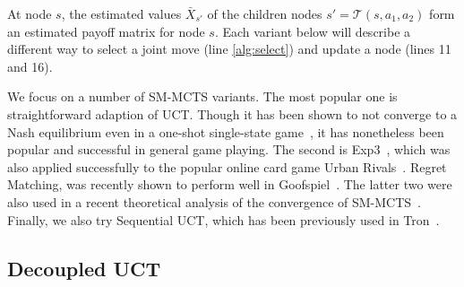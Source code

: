 \documentclass[conference]{IEEEtran}
\newcommand{\cA}{\mathcal{A}}
\newcommand{\cT}{\mathcal{T}}
\begin{document}
At node $s$, the estimated values $\bar{X}_{s'}$ of the children nodes $s' = \cT(s,a_1,a_2)$ 
form an estimated payoff matrix for node $s$. 
Each variant below will describe a different way to select a joint 
move (line \ref{alg:select}) and update a node (lines 11 and 16). 


We focus on a number of SM-MCTS variants. The most popular one is straightforward adaption of UCT. 
Though it has been shown to not converge to a Nash equilibrium even in a one-shot single-state 
game~\cite{Shafiei09}, it has nonetheless been popular and successful in general game playing. 
The second is Exp3~\cite{Exp3}, which was also applied successfully to the popular online card game 
Urban Rivals~\cite{Teytaud11Upper,StPierre12Online}. 
Regret Matching, was recently shown to perform well in Goofspiel~\cite{Lanctot13Goofspiel}.
The latter two were also used in a recent theoretical analysis of the convergence of SM-MCTS~\cite{Lisy13Computing}.
Finally, we also try Sequential UCT, which has been previously used in Tron~\cite{Samothrakis10Tron,Lanctot13Tron}.

\subsection{Decoupled UCT} 
\end{document}
